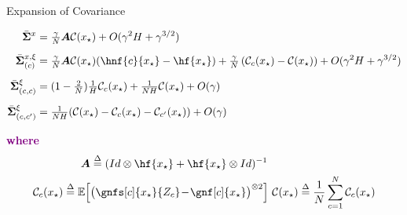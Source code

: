 \documentclass[aspectratio=169,12pt]{beamer}
\def\paramlim{x_\star}
\def\eqdef{\overset{\Delta}{=}}
\def\step{\gamma}
\def\nagent{N}
\def\Id{Id}
\def\covfunc{\mathcal{C}}
\newcommand{\loccovfunc}[1]{\mathcal{C}_{#1}}
\newcommand{\covparam}{\bar{\boldsymbol{\Sigma}}^{x}}
\newcommand{\covparamcvar}[1]{\bar{\boldsymbol{\Sigma}}^{x,\xi}_{(#1)}}
\newcommand{\covcvar}[1]{\bar{\boldsymbol{\Sigma}}^{\xi}_{(#1)}}
\begin{document}
\begin{frame}{Expansion of Covariance}
  \vspace{-1em}
  
\begin{align*}
\covparam
& =
\tfrac{\step}{\nagent} \boldsymbol{A} \covfunc(\paramlim)
+ O(\step^2 H + \step^{3/2})
\\[0.5em]
\covparamcvar{c}
& =
  \tfrac{\step}{\nagent} \boldsymbol{A} \covfunc(\paramlim) (\hnf{c}{\paramlim} - \hf{\paramlim})
 + \tfrac{\step}{\nagent}
\left( \loccovfunc{c}(\paramlim) - \covfunc(\paramlim)  \right)
+ O(\step^2 H + \step^{3/2})
\\[0.5em]
\covcvar{c,c} & =
( 1 - \tfrac{2}{\nagent} )
\tfrac{1}{H} \loccovfunc{c}(\paramlim)
+ \tfrac{1}{\nagent H} \covfunc(\paramlim)
+ O(\step)
\\[0.5em]
\covcvar{c,c'} & =
\tfrac{1}{\nagent H} ( \covfunc(\paramlim) 
- \loccovfunc{c}(\paramlim) 
- \loccovfunc{c'}(\paramlim))
+ O(\step)
\end{align*} 

\vspace{1em}
    
    \textbf{\textcolor{purple}{where}}
    \vspace{-1.5em}
        \begin{equation*}
        \begin{aligned}
        \boldsymbol{A} 
        &\eqdef (\Id \otimes \hf{\paramlim} + \hf{\paramlim} \otimes \Id)^{-1}
        \\
        \loccovfunc{c}(\paramlim) 
        \eqdef \mathbb{E} \Big[&  \big( \gnfs[c]{\paramlim}{Z_c} \!-\! \gnf[c]{\paramlim} \big)^{\otimes 2} \Big]
                         ~
                         \covfunc(\paramlim) \eqdef \frac{1}{\nagent} \sum_{c=1}^{\nagent}
          \loccovfunc{c}(\paramlim)
        \end{aligned}
      \end{equation*}
  
\end{frame}
\end{document}
